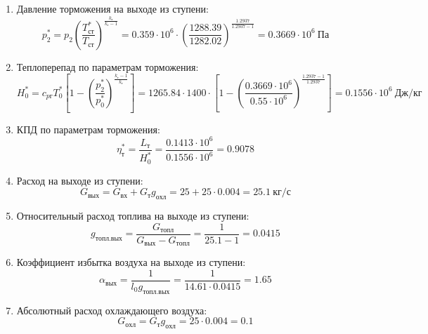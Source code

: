 \documentclass[a4paper,10pt]{article}
\begin{document}
\begin{enumerate}
        \item Давление торможения на выходе из ступени:
        \[
            p_2^* = p_2 \left(
                            \frac{ T_{ст}^* }{ T_{ст} }
                    \right) ^ \frac{ k_г }{ k_г - 1 } =
                 0.359 \cdot 10^6 \cdot \left(
                            \frac{ 1288.39 }{ 1282.02 }
                    \right) ^
                \frac{ 1.2937 }{ 1.2937 - 1 } =
            0.3669 \cdot 10^6 \ Па
        \]

        \item Теплоперепад по параметрам торможения:
        \[
            H_0^* = c_{pг} T_0^* \left[
                        1 - \left(
                                \frac{p_2^*}{p_0^*}
                            \right) ^
                        \frac{k_г - 1}{k_г}
                    \right] =
            1265.84 \cdot 1400 \cdot
                    \left[
                        1 - \left(
                                \frac{
                                    0.3669 \cdot 10^6
                                }{
                                    0.55 \cdot 10^6
                                }
                            \right) ^
                        \frac{1.2937 - 1}{1.2937}
                    \right] =
            0.1556 \cdot 10^6 \ Дж/кг
        \]

        \item КПД по параметрам торможения:
        \[
            \eta_т^* = \frac{ L_т }{ H_0^* } =
                \frac{
                    0.1413 \cdot 10^6
                }{
                    0.1556 \cdot 10^6 } =
            0.9078
        \]

        \item Расход на выходе из ступени:
        \[
            G_{вых} = G_{вх} + G_т g_{охл} =
                25 + 25 \cdot
                0.004 =
            25.1 \ кг/с
        \]

        \item Относительный расход топлива на выходе из ступени:
        \[
            g_{топл.вых} = \frac{ G_{топл} }{ G_{вых} - G_{топл} } =
                 \frac{ 1 }{ 25.1 - 1 } =
            0.0415
        \]

        \item Коэффициент избытка воздуха на выходе из ступени:
        \[
            \alpha_{вых} = \frac{ 1 }{ l_0 g_{топл.вых} } =
                \frac{ 1 }{ 14.61 \cdot 0.0415 } =
            1.65
        \]

        \item Абсолютный расход охлаждающего воздуха:
        \[
            G_{охл} = G_т g_{охл} = 25 \cdot 0.004 =
            0.1
        \]


\end{enumerate}
\end{document}
